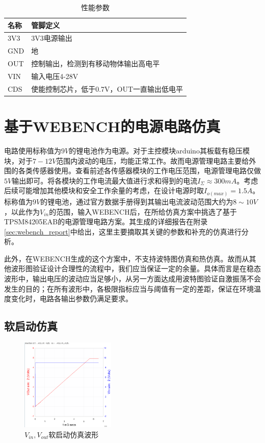 \documentclass[a4paper, 11pt]{article} %
\begin{document}
\begin{table}[H]
  \centering
  \caption{性能参数}
  \label{tab6}
  \begin{threeparttable}
    \small
    \begin{tabular} {p{80pt}p{220pt}}
      \hline
      名称&管脚定义\\
      \hline
      3V3&3V3电源输出\\
      GND&地\\
      OUT&控制输出，检测到有移动物体输出高电平\\
      VIN&输入电压4-28V\\
      CDS&使能控制芯片，低于0.7V，OUT一直输出低电平\\
      \hline
    \end{tabular}
    \small
  \end{threeparttable}
\end{table}

\section{基于WEBENCH的电源电路仿真}

电路使用标称值为$9V$的锂电池作为电源。对于主控模块arduino其板载有稳压模块，对于$7-12V$范围内波动的电压，均能正常工作。故而电源管理电路主要给外围的各类传感器使用。查看前述各传感器模块的工作电压范围，电源管理电路仅做$5V$输出即可。将各模块的工作电流最大值进行求和得到的电流$I_\Sigma \approx 300mA$。考虑后续可能增加其他模块和安全工作余量的考虑，在设计电源时取$I_{o(max)} = 1.5A$。标称值为$9V$的锂电池，通过官方数据手册得到其输出电流波动范围大约为$8 \sim 10V$，以此作为$V_{in}$的范围，输入WEBENCH后，在所给仿真方案中挑选了基于TPSM84205EAB的电源管理电路方案。其生成的详细报告在附录\ref{sec:webench_report}中给出，这里主要摘取其关键的参数和补充的仿真进行分析。

此外，在WEBENCH生成的这个方案中，不支持波特图仿真和热仿真。故而从其他波形图验证设计合理性的流程中，我们应当保证一定的余量。具体而言是在稳态波形中，输出电压的波动应当足够小，从另一方面达成用波特图验证自激振荡不会发生的目的；在所有波形中，各极限指标应当与阈值有一定的差距，保证在环境温度变化时，电路各输出参数仍满足要求。

\subsection{软启动仿真}

\begin{figure}[H]
    \centering
    \includegraphics[width = 0.4\textwidth]{startup_sim.png}
    \caption{$V_{in}, V_{out}$软启动仿真波形}
\end{figure}
\end{document}
